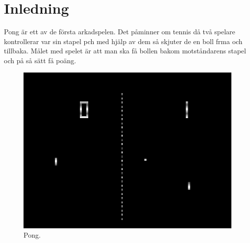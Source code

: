 \section{Inledning}
Pong är ett av de första arkadspelen. Det påminner om tennis då två spelare kontrollerar var sin stapel pch med hjälp av dem så skjuter de en boll frma och tillbaka. Målet med spelet är att man ska få bollen bakom motståndarens stapel och på så sätt få poäng.
\begin{center}
\begin{figure}[H]
    \centering
\includegraphics[scale=0.30]{../grafik/Pong.png}
\caption{Pong.}
\label{fig:gui}
\end{figure}
\end{center}